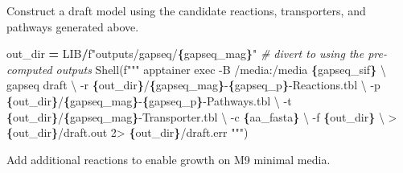\documentclass[
]{book}
\newenvironment{Shaded}{\begin{snugshade}}{\end{snugshade}}
\newcommand{\CharTok}[1]{\textcolor[rgb]{0.31,0.60,0.02}{#1}}
\newcommand{\CommentTok}[1]{\textcolor[rgb]{0.56,0.35,0.01}{\textit{#1}}}
\newcommand{\NormalTok}[1]{#1}
\newcommand{\OperatorTok}[1]{\textcolor[rgb]{0.81,0.36,0.00}{\textbf{#1}}}
\newcommand{\SpecialCharTok}[1]{\textcolor[rgb]{0.81,0.36,0.00}{\textbf{#1}}}
\newcommand{\SpecialStringTok}[1]{\textcolor[rgb]{0.31,0.60,0.02}{#1}}
\begin{document}
Construct a draft model using the candidate reactions, transporters, and pathways generated above.

\begin{Shaded}
\begin{Highlighting}[numbers=left,,]
\NormalTok{out\_dir }\OperatorTok{=}\NormalTok{ LIB}\OperatorTok{/}\SpecialStringTok{f"outputs/gapseq/}\SpecialCharTok{\{}\NormalTok{gapseq\_mag}\SpecialCharTok{\}}\SpecialStringTok{"} \CommentTok{\# divert to using the pre{-}computed outputs}
\NormalTok{Shell(}\SpecialStringTok{f"""}
\SpecialStringTok{apptainer exec {-}B /media:/media }\SpecialCharTok{\{}\NormalTok{gapseq\_sif}\SpecialCharTok{\}}\SpecialStringTok{ }\CharTok{\textbackslash{}}
\SpecialStringTok{    gapseq draft }\CharTok{\textbackslash{}}
\SpecialStringTok{        {-}r }\SpecialCharTok{\{}\NormalTok{out\_dir}\SpecialCharTok{\}}\SpecialStringTok{/}\SpecialCharTok{\{}\NormalTok{gapseq\_mag}\SpecialCharTok{\}}\SpecialStringTok{{-}}\SpecialCharTok{\{}\NormalTok{gapseq\_p}\SpecialCharTok{\}}\SpecialStringTok{{-}Reactions.tbl }\CharTok{\textbackslash{}}
\SpecialStringTok{        {-}p }\SpecialCharTok{\{}\NormalTok{out\_dir}\SpecialCharTok{\}}\SpecialStringTok{/}\SpecialCharTok{\{}\NormalTok{gapseq\_mag}\SpecialCharTok{\}}\SpecialStringTok{{-}}\SpecialCharTok{\{}\NormalTok{gapseq\_p}\SpecialCharTok{\}}\SpecialStringTok{{-}Pathways.tbl }\CharTok{\textbackslash{}}
\SpecialStringTok{        {-}t }\SpecialCharTok{\{}\NormalTok{out\_dir}\SpecialCharTok{\}}\SpecialStringTok{/}\SpecialCharTok{\{}\NormalTok{gapseq\_mag}\SpecialCharTok{\}}\SpecialStringTok{{-}Transporter.tbl }\CharTok{\textbackslash{}}
\SpecialStringTok{        {-}c }\SpecialCharTok{\{}\NormalTok{aa\_fasta}\SpecialCharTok{\}}\SpecialStringTok{ }\CharTok{\textbackslash{}}
\SpecialStringTok{        {-}f }\SpecialCharTok{\{}\NormalTok{out\_dir}\SpecialCharTok{\}}\SpecialStringTok{ }\CharTok{\textbackslash{}}
\SpecialStringTok{        \textgreater{} }\SpecialCharTok{\{}\NormalTok{out\_dir}\SpecialCharTok{\}}\SpecialStringTok{/draft.out 2\textgreater{} }\SpecialCharTok{\{}\NormalTok{out\_dir}\SpecialCharTok{\}}\SpecialStringTok{/draft.err}
\SpecialStringTok{"""}\NormalTok{)}
\end{Highlighting}
\end{Shaded}

Add additional reactions to enable growth on M9 minimal media.
\end{document}
